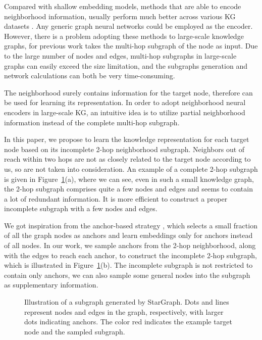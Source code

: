 \documentclass{article}
\begin{document}
Compared with shallow embedding models, methods that are able to encode neighborhood information, usually perform much better across various KG datasets \cite{zhang2018link,zhang2021labeling,wang2019coke}. Any generic graph neural networks could be employed as the encoder.
However, there is a problem adopting these methods to large-scale knowledge graphs, for previous work \cite{nathani2019learning,Wang2020KnowledgeGE} takes the multi-hop subgraph of the node as input. Due to the large number of nodes and edges, multi-hop subgraphs in large-scale graphs can easily exceed the size limitation, and the subgraphs generation and network calculations can both be very time-consuming.

The neighborhood surely contains information for the target node, therefore can be used for learning its representation.
In order to adopt neighborhood neural encoders in large-scale KG, an intuitive idea is to utilize partial neighborhood information instead of the complete multi-hop subgraph.

In this paper, we propose to learn the knowledge representation for each target node based on its incomplete 2-hop neighborhood subgraph. 
Neighbors out of reach within two hops are not as closely related to the target node according to us, so are not taken into consideration. 
An example of a complete 2-hop subgraph is given in Figure~\ref{fig:star_graph}(a), where we can see, even in such a small knowledge graph, the 2-hop subgraph comprises quite a few nodes and edges and seems to contain a lot of redundant information. It is more efficient to construct a proper incomplete subgraph with a few nodes and edges.

We got inspiration from the anchor-based strategy \cite{galkin2022nodepiece}, which selects a small fraction of all the graph nodes as anchors and learn embeddings only for anchors instead of all nodes. In our work, we sample anchors from the 2-hop neighborhood, along with the edges to reach each anchor, to construct the incomplete 2-hop subgraph, which is illustrated in Figure~\ref{fig:star_graph}(b). The incomplete subgraph is not restricted to contain only anchors, we can also sample some general nodes into the subgraph as supplementary information. 
\begin{figure}
 \centering
 \caption{Illustration of a subgraph generated by StarGraph. Dots and lines represent nodes and edges in the graph, respectively, with larger dots indicating anchors. The color red indicates the example target node and the sampled subgraph.}
 \label{fig:star_graph}
\end{figure}
\end{document}
